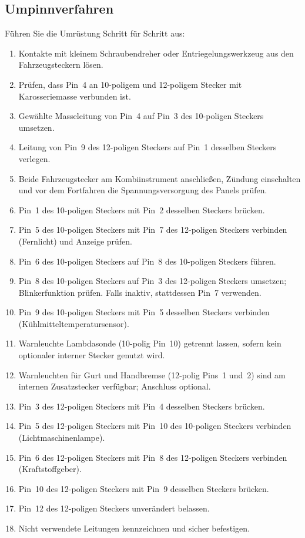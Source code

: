 \subsection{Umpinnverfahren}
Führen Sie die Umrüstung Schritt für Schritt aus:
\begin{enumerate}
    \item Kontakte mit kleinem Schraubendreher oder Entriegelungswerkzeug aus den Fahrzeugsteckern lösen.
    \item Prüfen, dass Pin~4 an 10-poligem und 12-poligem Stecker mit Karosseriemasse verbunden ist.
    \item Gewählte Masseleitung von Pin~4 auf Pin~3 des 10-poligen Steckers umsetzen.
    \item Leitung von Pin~9 des 12-poligen Steckers auf Pin~1 desselben Steckers verlegen.
    \item Beide Fahrzeugstecker am Kombiinstrument anschließen, Zündung einschalten und vor dem Fortfahren die Spannungsversorgung des Panels prüfen.
    \item Pin~1 des 10-poligen Steckers mit Pin~2 desselben Steckers brücken.
    \item Pin~5 des 10-poligen Steckers mit Pin~7 des 12-poligen Steckers verbinden (Fernlicht) und Anzeige prüfen.
    \item Pin~6 des 10-poligen Steckers auf Pin~8 des 10-poligen Steckers führen.
    \item Pin~8 des 10-poligen Steckers auf Pin~3 des 12-poligen Steckers umsetzen; Blinkerfunktion prüfen. Falls inaktiv, stattdessen Pin~7 verwenden.
    \item Pin~9 des 10-poligen Steckers mit Pin~5 desselben Steckers verbinden (Kühlmitteltemperatursensor).
    \item Warnleuchte Lambdasonde (10-polig Pin~10) getrennt lassen, sofern kein optionaler interner Stecker genutzt wird.
    \item Warnleuchten für Gurt und Handbremse (12-polig Pins~1 und~2) sind am internen Zusatzstecker verfügbar; Anschluss optional.
    \item Pin~3 des 12-poligen Steckers mit Pin~4 desselben Steckers brücken.
    \item Pin~5 des 12-poligen Steckers mit Pin~10 des 10-poligen Steckers verbinden (Lichtmaschinenlampe).
    \item Pin~6 des 12-poligen Steckers mit Pin~8 des 12-poligen Steckers verbinden (Kraftstoffgeber).
    \item Pin~10 des 12-poligen Steckers mit Pin~9 desselben Steckers brücken.
    \item Pin~12 des 12-poligen Steckers unverändert belassen.
    \item Nicht verwendete Leitungen kennzeichnen und sicher befestigen.
\end{enumerate}

